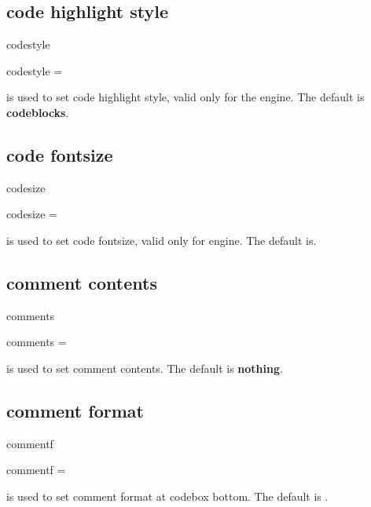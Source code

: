 \documentclass{ctxdoc-en}
\begin{document}
\subsection{code highlight style}

\begin{function}[added=2021-12-26,updated=2021-12-26]{codestyle}
  \begin{syntax}
    codestyle =  
  \end{syntax}
   is used to set code highlight style, valid only for the  engine.
  The default is \textbf{codeblocks}.
\end{function}

\subsection{code fontsize}

\begin{function}[added=2021-12-26,updated=2021-12-26]{codesize}
  \begin{syntax}
    codesize =  \init{\small}
  \end{syntax}
   is used to set code fontsize, valid only for  engine.
   The default is\textbf{}.
\end{function}

\subsection{comment contents}

\begin{function}[added=2021-12-26,updated=2021-12-26]{comments}
  \begin{syntax}
    comments =  
  \end{syntax}
   is used to set comment contents.
   The default is \textbf{nothing}.
\end{function}

\subsection{comment format}

\begin{function}[added=2021-12-26,updated=2021-12-26]{commentf}
  \begin{syntax}
    commentf =  \init{\small\sffamily}
  \end{syntax}
   is used to set comment format at codebox bottom.
  The default is \textbf{}.
\end{function}
\end{document}
